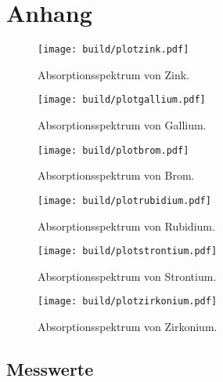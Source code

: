 \section{Anhang}

\begin{figure}[h]
  \centering
  \texttt{[image: build/plotzink.pdf]}
  \caption{Absorptionsspektrum von Zink.}
  \label{fig:plotzink}
\end{figure}
\begin{figure}[h]
  \centering
  \texttt{[image: build/plotgallium.pdf]}
  \caption{Absorptionsspektrum von Gallium.}
  \label{fig:plotgallium}
\end{figure}
\begin{figure}[h]
  \centering
  \texttt{[image: build/plotbrom.pdf]}
  \caption{Absorptionsspektrum von Brom.}
  \label{fig:plotbrom}
\end{figure}
\begin{figure}[h]
  \centering
  \texttt{[image: build/plotrubidium.pdf]}
  \caption{Absorptionsspektrum von Rubidium.}
  \label{fig:plotrubidium}
\end{figure}
\begin{figure}[h]
  \centering
  \texttt{[image: build/plotstrontium.pdf]}
  \caption{Absorptionsspektrum von Strontium.}
  \label{fig:plotstrontium}
\end{figure}
\begin{figure}[h]
  \centering
  \texttt{[image: build/plotzirkonium.pdf]}
  \caption{Absorptionsspektrum von Zirkonium.}
  \label{fig:plotzirkonium}
\end{figure}


\subsection{Messwerte}

